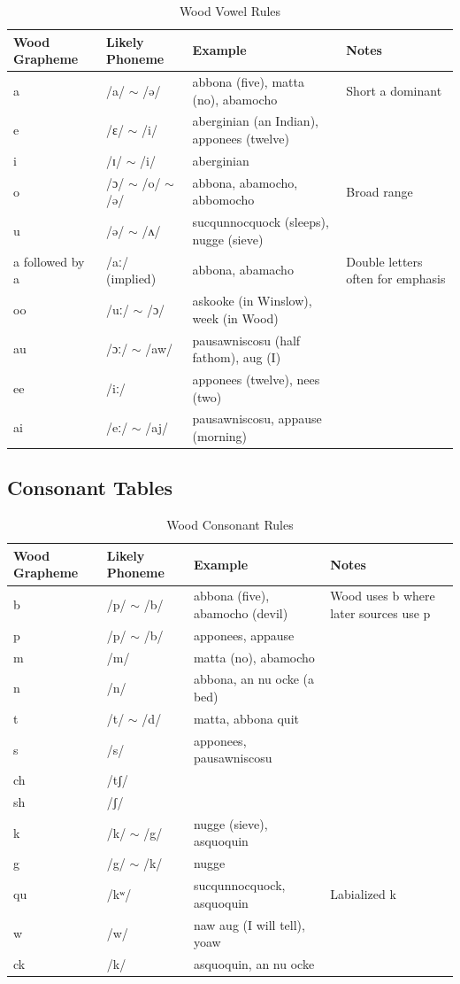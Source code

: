 \begin{table}[htbp]
\centering
\caption{Wood Vowel Rules}
\label{tab:1367-vowels}
\begin{tabular}{llll}
\hline
Wood Grapheme & Likely Phoneme & Example & Notes \\
\hline
a & /a/ $\sim$ /ə/ & abbona (five), matta (no), abamocho & Short a dominant \\
e & /ɛ/ $\sim$ /i/ & aberginian (an Indian), apponees (twelve) & \\
i & /ɪ/ $\sim$ /i/ & aberginian & \\
o & /ɔ/ $\sim$ /o/ $\sim$ /ə/ & abbona, abamocho, abbomocho & Broad range \\
u & /ə/ $\sim$ /ʌ/ & sucqunnocquock (sleeps), nugge (sieve) & \\
a followed by a & /aː/ (implied) & abbona, abamacho & Double letters often for emphasis \\
oo & /uː/ $\sim$ /ɔ/ & askooke (in Winslow), week (in Wood) & \\
au & /ɔː/ $\sim$ /aw/ & pausawniscosu (half fathom), aug (I) & \\
ee & /iː/ & apponees (twelve), nees (two) & \\
ai & /eː/ $\sim$ /aj/ & pausawniscosu, appause (morning) & \\
\hline
\end{tabular}
\end{table}

\subsection{Consonant Tables}

\begin{table}[htbp]
\centering
\caption{Wood Consonant Rules}
\label{tab:1367-consonants}
\begin{tabular}{llll}
\hline
Wood Grapheme & Likely Phoneme & Example & Notes \\
\hline
b & /p/ $\sim$ /b/ & abbona (five), abamocho (devil) & Wood uses b where later sources use p \\
p & /p/ $\sim$ /b/ & apponees, appause & \\
m & /m/ & matta (no), abamocho & \\
n & /n/ & abbona, an nu ocke (a bed) & \\
t & /t/ $\sim$ /d/ & matta, abbona quit & \\
s & /s/ & apponees, pausawniscosu & \\
ch & /tʃ/ & & \\
sh & /ʃ/ & & \\
k & /k/ $\sim$ /g/ & nugge (sieve), asquoquin & \\
g & /g/ $\sim$ /k/ & nugge & \\
qu & /kʷ/ & sucqunnocquock, asquoquin & Labialized k \\
w & /w/ & naw aug (I will tell), yoaw & \\
ck & /k/ & asquoquin, an nu ocke & \\
\hline
\end{tabular}
\end{table}


